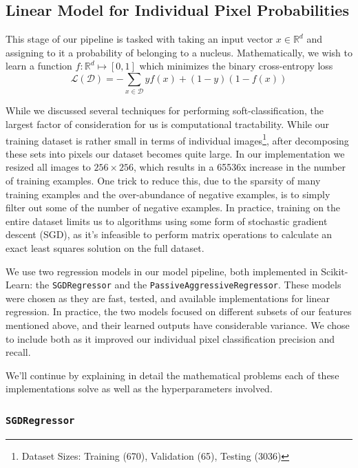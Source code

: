 \documentclass[paper=letter, fontsize=12pt]{article}
\numberwithin{equation}{section} %
\numberwithin{figure}{section} %
\numberwithin{table}{section} %
\begin{document}
\subsection{Linear Model for Individual Pixel Probabilities}

This stage of our pipeline is tasked with taking an input vector $x \in
\mathbb{R}^d$ and assigning to it a probability of belonging to a nucleus.
Mathematically, we wish to learn a function $f: \mathbb{R}^d \mapsto [0, 1]$
which minimizes the binary cross-entropy loss
\begin{equation}
    \mathcal{L}(\mathcal{D}) =
        - \sum_{x \in \mathcal{D}} yf(x) + (1 - y)(1 - f(x))
\end{equation}

While we discussed several techniques for performing soft-classification, the
largest factor of consideration for us is computational tractability.  While
our training dataset is rather small in terms of individual
images\footnote{Dataset Sizes: Training (670), Validation (65), Testing
(3036)}, after decomposing these sets into pixels our dataset becomes quite
large.  In our implementation we resized all images to $256 \times 256$, which
results in a 65536x increase in the number of training examples.  One
trick to reduce this, due to the sparsity of many training examples and the
over-abundance of negative examples, is to simply filter out some of the number
of negative examples.  In practice, training on the entire dataset limits us to
algorithms using some form of stochastic gradient descent (SGD), as it's
infeasible to perform matrix operations to calculate an exact least squares
solution on the full dataset.

We use two regression models in our model pipeline, both implemented in
Scikit-Learn\cite{scikit-learn}: the \texttt{SGDRegressor} and the
\texttt{PassiveAggressiveRegressor}\cite{paregression}.  These models were
chosen as they are fast, tested, and available implementations for linear
regression.  In practice, the two models focused on different subsets of our
features mentioned above, and their learned outputs have considerable variance.
We chose to include both as it improved our individual pixel classification
precision and recall.

We'll continue by explaining in detail the mathematical problems each of these
implementations solve as well as the hyperparameters involved.

\subsubsection{\texttt{SGDRegressor}}
\end{document}
